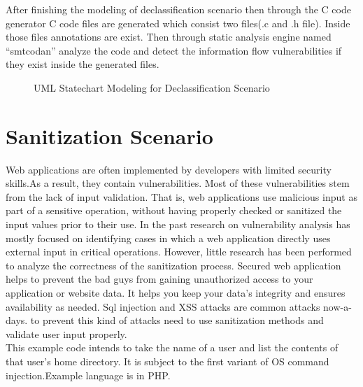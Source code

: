  After finishing the modeling of declassification scenario then through the C code generator C code files are generated which consist two files(.c and .h file). Inside those files annotations are exist. Then through static analysis engine named \enquote{smtcodan} analyze the code and detect the information flow vulnerabilities if they exist inside the generated files.
 
\begin{figure}[htbp]
	\centering
	\label{declassification_scenario}
	\caption{UML Statechart Modeling for Declassification Scenario}
\end{figure}


\section{Sanitization Scenario}
Web applications are often implemented by developers with limited security skills.As a result, they
contain vulnerabilities. Most of these vulnerabilities stem
from the lack of input validation. That is, web applications
use malicious input as part of a sensitive operation, without having properly checked or sanitized the input values
prior to their use.
In the past research on vulnerability analysis has mostly focused on identifying cases in which a web application directly uses external input in critical operations. However,
little research has been performed to analyze the correctness of the sanitization process. Secured web application helps to prevent the bad guys from gaining unauthorized access to your application or website data. It helps you keep your data's integrity and ensures availability as needed. Sql injection and XSS attacks are common attacks now-a-days. to prevent this kind of attacks need to use sanitization methods and validate user input properly.\\
This example code intends to take the name of a user and list the contents of that user's home directory. It is subject to the first variant of OS command injection.Example language is in PHP.

